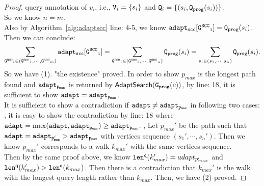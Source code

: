 \begin{proof}
  query annotation of $v_i$, i.e., $\mathtt{V}_i = \{s_i\}$ and $\mathtt{Q}_i = \{(s_i, \mathtt{{Q_{prog}}}(s_i))\}$.
  \\
  So we know $n = m$.
  \\
  Also by Algorithm~\ref{alg:adaptscc} line: 4-5, we know $\mathtt{adapt_{scc}[\mathtt{G^{SCC}}_i]} = \mathtt{{Q_{prog}}}(s_i)$.
  \\
  Then we can conclude:
  \[
    \sum_{\mathtt{G^{SCC}}_i \in (\mathtt{G^{SCC}}_1, \cdots, \mathtt{G^{SCC}}_m)} \mathtt{adapt_{scc}[\mathtt{G^{SCC}}_i]} = 
    \sum_{\mathtt{G^{SCC}}_i \in (\mathtt{G^{SCC}}_1, \cdots, \mathtt{G^{SCC}}_n)} \mathtt{{Q_{prog}}}(s_i)
    = \sum_{s_i \in (s_1, \cdots, s_n)} \mathtt{{Q_{prog}}}(s_i).
  \]
So we have (1). "the existence" proved.
In order to show $p_{max}$ is the longest path found and $\mathtt{adapt_{p_{max}}}$ is returned by $\mathsf{AdaptSearch}(\mathtt{{G_{prog}}}(c))$,
by line: 18, it is sufficient to show $\mathtt{adapt = adapt_{p_{max}}}$.
\\
It is sufficient to show a contradiction if $\mathtt{adapt \neq adapt_{p_{max}}}$ in following two cases:
, it is easy to show the contradiction by line: 18 where 
$\mathtt{adapt = \max(adapt, adapt_{p_{max}}) \geq adapt_{p_{max}} }$.
%
,
Let $p_{max}'$ be the path such that $\mathtt{adapt = adapt_{p_{max}'} > adapt_{p_{max}}}$ with vertices sequence $(s_1', \cdots, s_n')$.
Then we know $p_{max}'$ corresponds to a walk $k_{max}'$ with the same vertices sequence.
\\
Then by the same proof above, we know $\mathtt{len}^{\tt q}(k_{max}') = adapt_{p_{max}'}$
and $\mathtt{len}^{\tt q}(k_{max}') > \mathtt{len}^{\tt q}(k_{max})$.
Then there is a contradiction that $k_{max}'$ is the walk with the longest query length rather than $k_{max} $.
Then, we have (2) proved.
\end{proof}